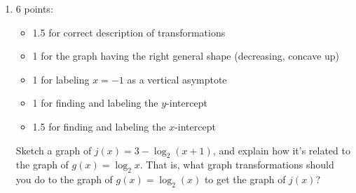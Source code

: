 \documentclass{article}
\begin{document}
\begin{enumerate}
\begin{enumerate}
    \begin{solution} 
      \begin{center}
      \end{center}
    \end{solution} 

  \item

    \begin{grading}
      6 points:
      \begin{itemize}[nosep]
      \item 1.5 for correct description of transformations
      \item 1 for the graph having the right general shape (decreasing, concave up)
      \item 1 for labeling $x = -1$ as a vertical asymptote
      \item 1 for finding and labeling the $y$-intercept
      \item 1.5 for finding and labeling the $x$-intercept
      \end{itemize}
    \end{grading} 

    \begin{problem}[\stretch{1.25}]
      Sketch a graph of $j(x) = 3 - \log_2 (x + 1)$, and explain how it's related to the graph of $g(x) = \log_2 x$. That is, what graph transformations should you do to the graph of $g(x) = \log_2(x)$ to get the graph of $j(x)$? 


\end{problem}
\end{enumerate}
\end{enumerate}
\end{document}
